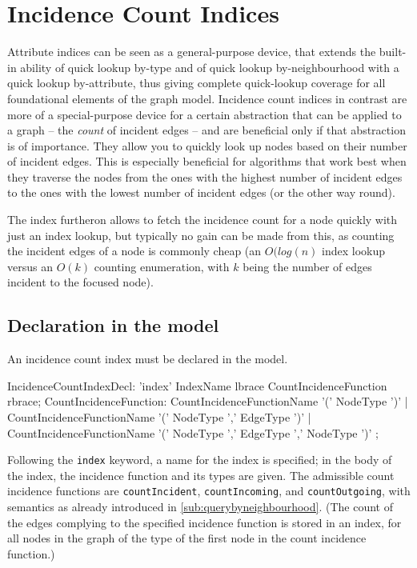 \section{Incidence Count Indices}\label{sec:incidencecountindices}
Attribute indices can be seen as a general-purpose device, that extends the built-in ability of quick lookup by-type and of quick lookup by-neighbourhood with a quick lookup by-attribute, thus giving complete quick-lookup coverage for all foundational elements of the graph model.
Incidence count indices in contrast are more of a special-purpose device for a certain abstraction that can be applied to a graph -- the \emph{count} of incident edges -- and are beneficial only if that abstraction is of importance.
They allow you to quickly look up nodes based on their number of incident edges.
This is especially beneficial for algorithms that work best when they traverse the nodes from the ones with the highest number of incident edges to the ones with the lowest number of incident edges (or the other way round).

The index furtheron allows to fetch the incidence count for a node quickly with just an index lookup, 
but typically no gain can be made from this, as counting the incident edges of a node is commonly cheap (an $O(log(n)$ index lookup versus an $O(k)$ counting enumeration, with $k$ being the number of edges incident to the focused node).

\subsection*{Declaration in the model}

An incidence count index must be declared in the model.

\begin{rail}
IncidenceCountIndexDecl: 'index' IndexName lbrace CountIncidenceFunction rbrace;
CountIncidenceFunction: 
  CountIncidenceFunctionName '(' NodeType ')' |
  CountIncidenceFunctionName '(' NodeType ',' EdgeType ')' |
  CountIncidenceFunctionName '(' NodeType ',' EdgeType ',' NodeType ')'
  ;
\end{rail}\label{IncidenceCountIndexDecl}

Following the \texttt{index} keyword, a name for the index is specified; in the body of the index, the incidence function and its types are given.
The admissible count incidence functions are \texttt{countIncident}, \texttt{countIncoming}, and \texttt{countOutgoing}, with semantics as already introduced in \ref{sub:querybyneighbourhood}.
(The count of the edges complying to the specified incidence function is stored in an index, for all nodes in the graph of the type of the first node in the count incidence function.)

